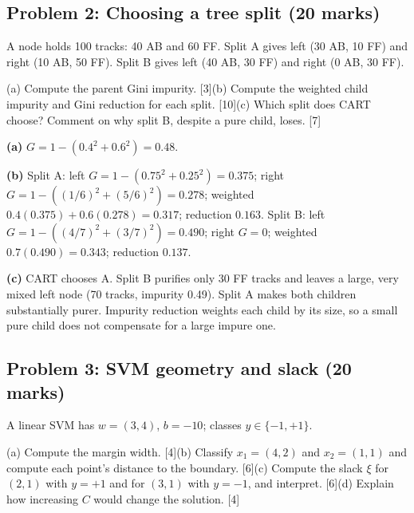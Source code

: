 \documentclass[11pt]{article}
\begin{document}
\subsection{Problem 2: Choosing a tree split \normalfont\small\color{GreyN}(20 marks)}

\begin{prob}A node holds 100 tracks: 40 AB and 60 FF. Split A gives left (30 AB, 10 FF) and right (10 AB, 50 FF). Split B gives left (40 AB, 30 FF) and right (0 AB, 30 FF).

(a) Compute the parent Gini impurity. [3]\newline (b) Compute the weighted child impurity and Gini reduction for each split. [10]\newline (c) Which split does CART choose? Comment on why split B, despite a pure child, loses. [7]\end{prob}

\begin{soln}\textbf{(a)} $G=1-(0.4^2+0.6^2)=0.48$.

\textbf{(b)} Split A: left $G=1-(0.75^2+0.25^2)=0.375$; right $G=1-((1/6)^2+(5/6)^2)=0.278$; weighted $0.4(0.375)+0.6(0.278)=0.317$; reduction $\mathbf{0.163}$. Split B: left $G=1-((4/7)^2+(3/7)^2)=0.490$; right $G=0$; weighted $0.7(0.490)=0.343$; reduction $\mathbf{0.137}$.

\textbf{(c)} CART chooses A. Split B purifies only 30 FF tracks and leaves a large, very mixed left node (70 tracks, impurity 0.49). Split A makes both children substantially purer. Impurity reduction weights each child by its size, so a small pure child does not compensate for a large impure one.\end{soln}

\subsection{Problem 3: SVM geometry and slack \normalfont\small\color{GreyN}(20 marks)}

\begin{prob}A linear SVM has $w=(3,4)$, $b=-10$; classes $y\in\{-1,+1\}$.

(a) Compute the margin width. [4]\newline (b) Classify $x_1=(4,2)$ and $x_2=(1,1)$ and compute each point's distance to the boundary. [6]\newline (c) Compute the slack $\xi$ for $(2,1)$ with $y=+1$ and for $(3,1)$ with $y=-1$, and interpret. [6]\newline (d) Explain how increasing $C$ would change the solution. [4]\end{prob}
\end{document}
